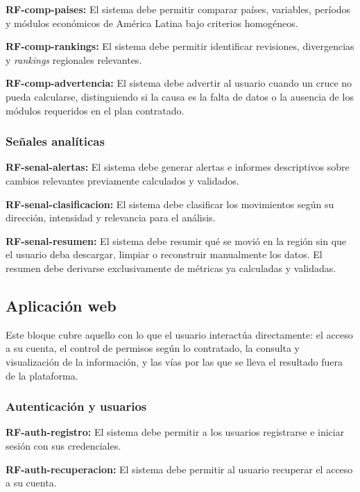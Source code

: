\documentclass[11pt,a4paper]{article}
\newcommand{\rf}[2]{%
  \noindent
  \textbf{RF-#1:} #2
  \par\smallskip
}
\begin{document}
\rf{comp-paises}{El sistema debe permitir comparar pa\'ises, variables,
per\'iodos y m\'odulos econ\'omicos de Am\'erica Latina bajo criterios
homog\'eneos.}

\rf{comp-rankings}{El sistema debe permitir identificar revisiones, divergencias
y \emph{rankings} regionales relevantes.}

\rf{comp-advertencia}{El sistema debe advertir al usuario cuando un cruce no
pueda calcularse, distinguiendo si la causa es la falta de datos o la ausencia
de los m\'odulos requeridos en el plan contratado.}

\subsubsection{Señales analíticas}

\rf{senal-alertas}{El sistema debe generar alertas e informes descriptivos sobre
cambios relevantes previamente calculados y validados.}

\rf{senal-clasificacion}{El sistema debe clasificar los movimientos seg\'un su
direcci\'on, intensidad y relevancia para el an\'alisis.}

\rf{senal-resumen}{El sistema debe resumir qu\'e se movi\'o en la regi\'on sin
que el usuario deba descargar, limpiar o reconstruir manualmente los datos. El
resumen debe derivarse exclusivamente de m\'etricas ya calculadas y validadas.}

\subsection{Aplicación web}

Este bloque cubre aquello con lo que el usuario interactúa directamente: el
acceso a su cuenta, el control de permisos según lo contratado, la consulta y
visualización de la información, y las vías por las que se lleva el resultado
fuera de la plataforma.

\subsubsection{Autenticación y usuarios}

\rf{auth-registro}{El sistema debe permitir a los usuarios registrarse e iniciar
sesi\'on con sus credenciales.}

\rf{auth-recuperacion}{El sistema debe permitir al usuario recuperar el acceso a
su cuenta.}
\end{document}
